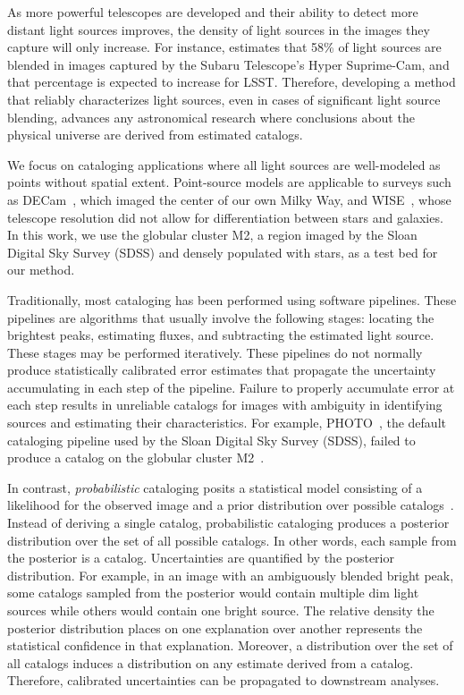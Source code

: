 As more powerful telescopes are developed and their ability to detect more distant light sources improves, the density of light sources in the images they capture will only increase. 
For instance, \cite{Bosch_2017_LSST} estimates that 58\% of light sources are blended in images captured by the Subaru Telescope’s Hyper Suprime-Cam, and that percentage is expected to increase for LSST. 
Therefore, developing a method that reliably characterizes light sources, even in cases of significant light source blending, 
advances any astronomical research where conclusions about the physical universe are derived from estimated catalogs. 

We focus on cataloging applications where all light sources are well-modeled as points without spatial extent. 
Point-source models are applicable to surveys such as DECam~\cite{Schlafly_2018_DECam}, which imaged the center of our own Milky Way, and WISE~\cite{Wright_2010_WISESurvey}, whose telescope resolution did not allow for differentiation between stars and galaxies.
In this work, we use the globular cluster M2, a region imaged by the Sloan Digital Sky Survey (SDSS) and densely populated with stars, as a test bed for our method. 

\bigbreak


Traditionally, most cataloging has been performed using software pipelines.
These pipelines are algorithms that usually involve the following stages: locating the brightest peaks, estimating fluxes, and subtracting the estimated light source.
These stages may be performed iteratively.
These pipelines do not normally produce statistically calibrated error estimates that propagate 
the uncertainty accumulating in each step of the pipeline. 
Failure to properly accumulate error at each step results in unreliable catalogs for images with ambiguity in identifying sources and estimating their characteristics.
For example, PHOTO~\cite{lupton2001sdss}, the default cataloging pipeline used by the Sloan Digital Sky Survey (SDSS), failed to 
produce a catalog on the globular cluster M2~\cite{Portillo_2017}. 

In contrast, {\itshape probabilistic} cataloging posits a statistical model consisting of a likelihood for the observed image and a prior distribution over possible catalogs~\cite{Portillo_2017, Brewer_2013, Feder_2019}. 
Instead of deriving a single catalog, probabilistic cataloging produces a posterior distribution over the set of all possible catalogs. 
In other words, each sample from the posterior is a catalog. 
Uncertainties are quantified by the posterior distribution. 
For example, in an image with an ambiguously blended bright peak, some catalogs sampled from the posterior would contain multiple dim light sources while others would contain one bright source. 
The relative density the posterior distribution places on one explanation over another represents the statistical confidence in that explanation. 
Moreover, a distribution over the set of all catalogs induces a distribution on any estimate derived from a catalog. Therefore, calibrated uncertainties can be propagated to downstream analyses.  

